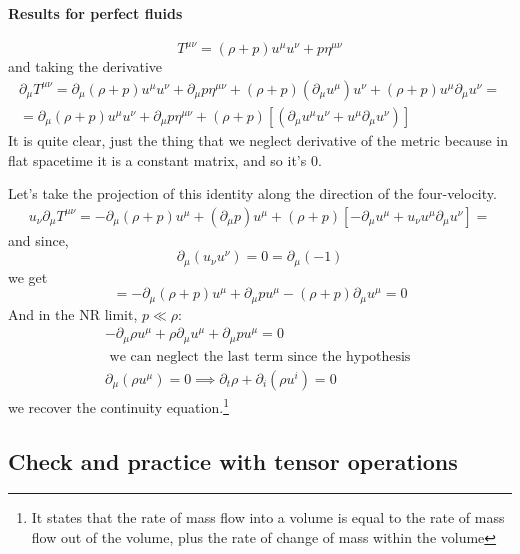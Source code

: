 \paragraph{Results for perfect fluids}
\[
T^{\mu \nu } = \left( \rho  +p \right) u^{\mu }u^{\nu }+p \eta^{\mu \nu }
\]
and taking the derivative
\begin{gather*}
\partial_{\mu } T^{\mu \nu } = \partial_{\mu }\left( \rho +p \right)u^{\mu }u^{\nu } + \partial_{\mu }p \eta^{\mu \nu } + \left( \rho +p \right)\left( \partial_{\mu }u^{\mu } \right)u^{\nu } + \left( \rho +p \right) u^{\mu }\partial_{\mu }u^{\nu } = \\
= \partial_{\mu }\left( \rho +p \right)u^{\mu }u^{\nu }+ \partial_{\mu }p \eta^{\mu \nu } + \left( \rho +p \right) [\left( \partial_{\mu }u^{\mu }u^{\nu } + u^{\mu }\partial_{\mu }u^{\nu } \right)]
\end{gather*}
It is quite clear, just the thing that we neglect derivative of the metric because in flat spacetime it is a constant matrix, and so it's 0.\par
Let's take the projection of this identity along the direction of the four-velocity.
\begin{gather*}
	u_{\nu }\partial_{\mu }T^{\mu \nu } = -\partial_{\mu }\left( \rho +p \right)u^{\mu }+\left( \partial_{\mu }p \right)u^{\mu }+\left( \rho +p \right)[-\partial_{\mu }u^{\mu }+u_{\nu }u^{\mu }\partial_{\mu }u^{\nu }] =
\end{gather*}
and since, 
\[
\partial_{\mu }\left( u_{\nu }u^{\nu } \right) = 0 = \partial_{\mu }\left( -1 \right)
\]
we get
\begin{equation}
= -\partial_{\mu }\left( \rho +p \right)u^{\mu } + \partial_{\mu }p u^{\mu }- \left( \rho +p \right)\partial_{\mu }u^{\mu } = 0
\end{equation}
And in the NR limit, $p\ll \rho $:
\begin{gather*}
-\partial_{\mu }\rho  u^{\mu }+\rho \partial_{\mu }u^{\mu }+ \partial_{\mu }pu^{\mu }=0 \\
\text{ we can neglect the last term since the hypothesis } \\
\partial_{\mu }\left( \rho u^{\mu } \right) = 0 \implies \partial_{t}\rho +\partial_{i}\left( \rho u^{i} \right) = 0
\end{gather*}
we recover the continuity equation.\footnote{It states that the rate of mass flow into a volume is equal to the rate of mass flow out of the volume, plus the rate of change of mass within the volume}

\subsection{Check and practice with tensor operations}



